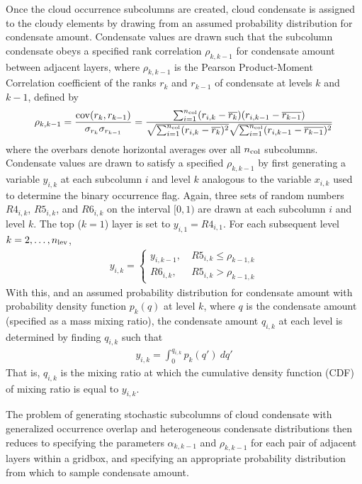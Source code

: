 Once the cloud occurrence subcolumns are created, cloud condensate is assigned to the cloudy elements by drawing from an assumed probability distribution for condensate amount. Condensate values are drawn such that the subcolumn condensate obeys a specified rank correlation $\rho_{k, k-1}$ for condensate amount between adjacent layers, where $\rho_{k, k-1}$ is the Pearson Product-Moment Correlation coefficient of the ranks $r_{k}$ and $r_{k-1}$ of condensate at levels $k$ and $k-1$, defined by
\begin{gather}
    \rho_{k, k-1} = \frac{
        {\rm cov}(r_{k}, r_{k-1})
    }{
        \sigma_{r_{k}} \sigma_{r_{k-1}}
    } = \frac{
        \sum_{i=1}^{n_{\rm col}} (r_{i, k} - \overline{r_{k}})(r_{i, k-1} - \overline{r_{k-1}})
    }{
        \sqrt{\sum_{i=1}^{n_{\rm col}} (r_{i, k} - \overline{r_{k}})^2}
        \sqrt{\sum_{i=1}^{n_{\rm col}} (r_{i, k-1} - \overline{r_{k-1}})^2}
    }
    \label{rankcorr_equation}
\end{gather}
where the overbars denote horizontal averages over all $n_{\rm col}$ subcolumns. Condensate values are drawn to satisfy a specified $\rho_{k, k-1}$ by first generating a variable $y_{i, k}$ at each subcolumn $i$ and level $k$ analogous to the variable $x_{i, k}$ used to determine the binary occurrence flag. Again, three sets of random numbers $R4_{i, k}$, $R5_{i, k}$, and $R6_{i, k}$ on the interval $[0, 1)$ are drawn at each subcolumn $i$ and level $k$. The top ($k = 1$) layer is set to $y_{i, 1} = R4_{i, 1}$. For each subsequent level $k = 2, \ldots, n_{\rm lev}$,
\begin{align}
    y_{i, k} = \begin{cases}
        y_{i, k-1}, ~ & R5_{i, k} \le \rho_{k-1, k} \\
        R6_{i, k},  ~ & R5_{i, k} > \rho_{k-1, k}
    \end{cases}
\end{align}
With this, and an assumed probability distribution for condensate amount with probability density function $p_k(q)$ at level $k$, where $q$ is the condensate amount (specified as a mass mixing ratio), the condensate amount $q_{i, k}$ at each level is determined by finding $q_{i, k}$ such that
\begin{align}
    y_{i, k} = \int_0^{q_{i, k}} p_{k}(q') ~dq'
\end{align}
That is, $q_{i, k}$ is the mixing ratio at which the cumulative density function (CDF) of mixing ratio is equal to $y_{i, k}$.

The problem of generating stochastic subcolumns of cloud condensate with generalized occurrence overlap and heterogeneous condensate distributions then reduces to specifying the parameters $\alpha_{k, k-1}$ and $\rho_{k, k-1}$ for each pair of adjacent layers within a gridbox, and specifying an appropriate probability distribution from which to sample condensate amount. 


